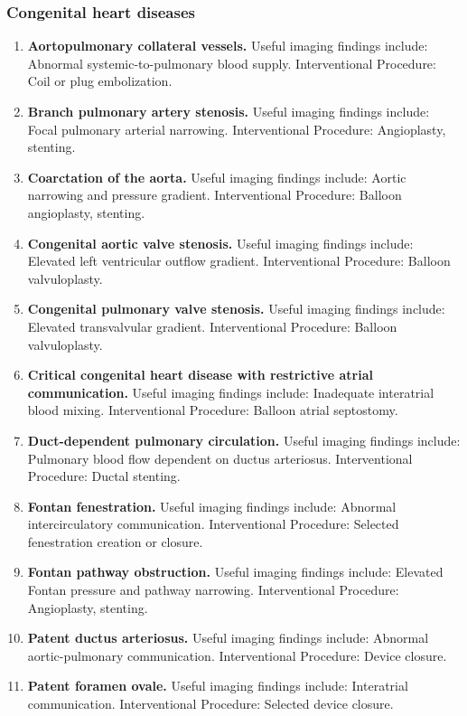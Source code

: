 \subsubsection{Congenital heart diseases}
\begin{enumerate}[leftmargin=*,itemsep=0.45em,topsep=0.4em]
\item \textbf{Aortopulmonary collateral vessels.} Useful imaging findings include: Abnormal systemic-to-pulmonary blood supply. Interventional Procedure: Coil or plug embolization.
\item \textbf{Branch pulmonary artery stenosis.} Useful imaging findings include: Focal pulmonary arterial narrowing. Interventional Procedure: Angioplasty, stenting.
\item \textbf{Coarctation of the aorta.} Useful imaging findings include: Aortic narrowing and pressure gradient. Interventional Procedure: Balloon angioplasty, stenting.
\item \textbf{Congenital aortic valve stenosis.} Useful imaging findings include: Elevated left ventricular outflow gradient. Interventional Procedure: Balloon valvuloplasty.
\item \textbf{Congenital pulmonary valve stenosis.} Useful imaging findings include: Elevated transvalvular gradient. Interventional Procedure: Balloon valvuloplasty.
\item \textbf{Critical congenital heart disease with restrictive atrial communication.} Useful imaging findings include: Inadequate interatrial blood mixing. Interventional Procedure: Balloon atrial septostomy.
\item \textbf{Duct-dependent pulmonary circulation.} Useful imaging findings include: Pulmonary blood flow dependent on ductus arteriosus. Interventional Procedure: Ductal stenting.
\item \textbf{Fontan fenestration.} Useful imaging findings include: Abnormal intercirculatory communication. Interventional Procedure: Selected fenestration creation or closure.
\item \textbf{Fontan pathway obstruction.} Useful imaging findings include: Elevated Fontan pressure and pathway narrowing. Interventional Procedure: Angioplasty, stenting.
\item \textbf{Patent ductus arteriosus.} Useful imaging findings include: Abnormal aortic-pulmonary communication. Interventional Procedure: Device closure.
\item \textbf{Patent foramen ovale.} Useful imaging findings include: Interatrial communication. Interventional Procedure: Selected device closure.

\end{enumerate}
